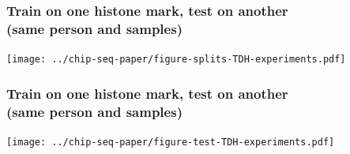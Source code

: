 \documentclass{beamer}
\begin{document}
\begin{frame}
  \frametitle{Train on one histone mark, test on another\\
(same person and samples)}
  \texttt{[image: ../chip-seq-paper/figure-splits-TDH-experiments.pdf]}
\end{frame}

\begin{frame}
  \frametitle{Train on one histone mark, test on another\\
(same person and samples)}
  \texttt{[image: ../chip-seq-paper/figure-test-TDH-experiments.pdf]}
\end{frame}
\end{document}
